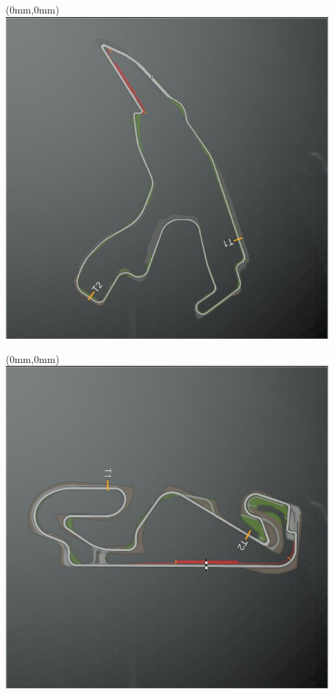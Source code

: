 \null\newpage
\begin{textblock*}{30mm}(0mm,0mm)%
\includegraphics[width=120mm]{TR/2015-05-20_00021.png}
\end{textblock*}
\null\newpage
\begin{textblock*}{30mm}(0mm,0mm)%
\includegraphics[width=120mm]{TR/2015-05-20_00018.png}
\end{textblock*}
